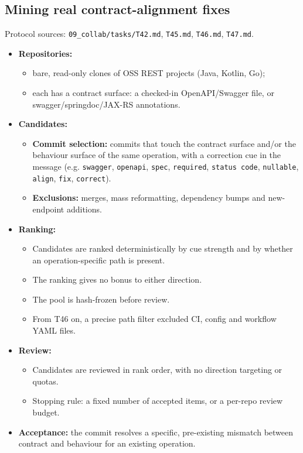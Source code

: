\documentclass[acmsmall,screen,review,anonymous]{acmart}
\begin{document}
\subsection{Mining real contract-alignment fixes}
Protocol sources: \texttt{09\_collab/\allowbreak{}tasks/\allowbreak{}T42.md}, \texttt{T45.md}, \texttt{T46.md}, \texttt{T47.md}.
\begin{itemize}
\item \textbf{Repositories:}
\begin{itemize}
\item bare, read-only clones of OSS REST projects (Java, Kotlin, Go);
\item each has a contract surface: a checked-in OpenAPI/Swagger file, or swagger/springdoc/JAX-RS annotations.
\end{itemize}
\item \textbf{Candidates:}
\begin{itemize}
\item \textbf{Commit selection:} commits that touch the contract surface and/or the behaviour surface of the same operation, with a correction cue in the message (e.g. \texttt{swagger}, \texttt{openapi}, \texttt{spec}, \texttt{required}, \texttt{status code}, \texttt{nullable}, \texttt{align}, \texttt{fix}, \texttt{correct}).
\item \textbf{Exclusions:} merges, mass reformatting, dependency bumps and new-endpoint additions.
\end{itemize}
\item \textbf{Ranking:}
\begin{itemize}
\item Candidates are ranked deterministically by cue strength and by whether an operation-specific path is present.
\item The ranking gives no bonus to either direction.
\item The pool is hash-frozen before review.
\item From T46 on, a precise path filter excluded CI, config and workflow YAML files.
\end{itemize}
\item \textbf{Review:}
\begin{itemize}
\item Candidates are reviewed in rank order, with no direction targeting or quotas.
\item Stopping rule: a fixed number of accepted items, or a per-repo review budget.
\end{itemize}
\item \textbf{Acceptance:} the commit resolves a specific, pre-existing mismatch between contract and behaviour for an existing operation.

\end{itemize}
\end{document}
